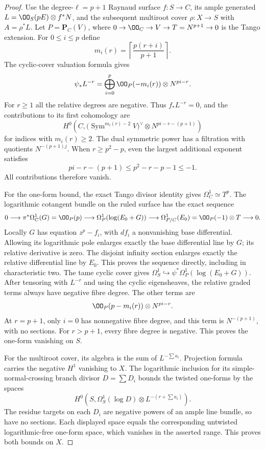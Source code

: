 \begin{proof}
Use the degree-$\ell=p+1$ Raynaud surface $f:S\to C$, its ample generated $L=\OO_S(pE)\otimes f^*N$, and the subsequent multiroot cover $\rho:X\to S$ with $A=\rho^*L$.  Let $P=\mathbf P_C(V)$, where $0\to\OO_C\to V\to T=N^{p+1}\to0$ is the Tango extension.  For $0\leq i\leq p$ define
\[
                  m_i(r)=\left\lceil\frac{p(r+i)}{p+1}\right\rceil.
\]
The cyclic-cover valuation formula gives
\[
 \psi_*L^{-r}
       =\bigoplus_{i=0}^{p}\OO_P(-m_i(r))\otimes N^{pi-r}.
\]
For $r\geq1$ all the relative degrees are negative.  Thus $f_*L^{-r}=0$, and the contributions to its first cohomology are
\[
 H^0\!\left(C,
   \bigl(\operatorname{Sym}^{m_i(r)-2}V\bigr)^\vee
                        \otimes N^{pi-r-(p+1)}\right)
\]
for indices with $m_i(r)\geq2$.  The dual symmetric power has a filtration with quotients $N^{-(p+1)j}$.  When $r\geq p^2-p$, even the largest additional exponent satisfies
\[
                    pi-r-(p+1)\leq p^2-r-p-1\leq-1.
\]
All contributions therefore vanish.

For the one-form bound, the exact Tango divisor identity gives
$\Omega_C^1\simeq T^p$.  The logarithmic cotangent bundle on the ruled surface has the exact sequence
\[
 0\longrightarrow\pi^*\Omega_C^1(G)=\OO_P(p)
 \longrightarrow\Omega_P^1(\log(E_0+G))
 \longrightarrow\Omega_{P/C}^1(E_0)=\OO_P(-1)\otimes T
 \longrightarrow0.
\]
Locally $G$ has equation $z^p-f_i$, with $df_i$ a nonvanishing base differential.  Allowing its logarithmic pole enlarges exactly the base differential line by $G$; its relative derivative is zero.  The disjoint infinity section enlarges exactly the relative differential line by $E_0$.  This proves the sequence directly, including in characteristic two.
The tame cyclic cover gives
$\Omega_S^1\hookrightarrow\psi^*\Omega_P^1(\log(E_0+G))$.
After tensoring with $L^{-r}$ and using the cyclic eigensheaves, the relative graded terms always have negative fibre degree.  The other terms are
\[
                    \OO_P(p-m_i(r))\otimes N^{pi-r}.
\]
At $r=p+1$, only $i=0$ has nonnegative fibre degree, and this term is $N^{-(p+1)}$, with no sections.  For $r>p+1$, every fibre degree is negative.  This proves the one-form vanishing on $S$.

For the multiroot cover, its algebra is the sum of $L^{-\sum a_i}$.  Projection formula carries the negative $H^1$ vanishing to $X$.  The logarithmic inclusion for its simple-normal-crossing branch divisor $D=\sum D_i$ bounds the twisted one-forms by the spaces
\[
 H^0\!\left(S,\Omega_S^1(\log D)\otimes L^{-(r+\sum a_i)}\right).
\]
The residue targets on each $D_i$ are negative powers of an ample line bundle, so have no sections.  Each displayed space equals the corresponding untwisted logarithmic-free one-form space, which vanishes in the asserted range.  This proves both bounds on $X$.
\end{proof}

